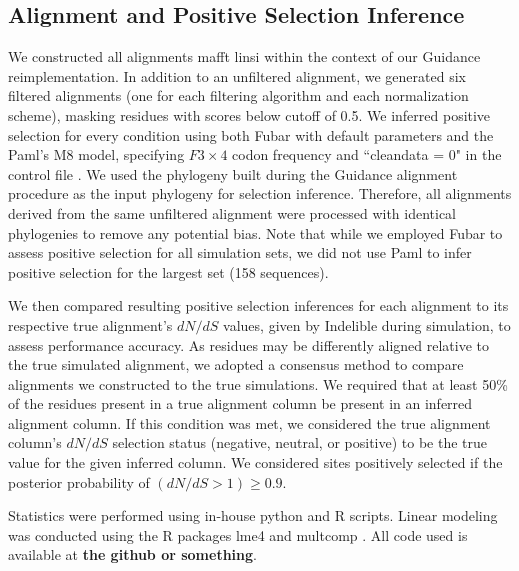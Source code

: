 \documentclass[10pt]{article}
\begin{document}
\subsection*{Alignment and Positive Selection Inference}
We constructed all alignments mafft linsi \citep{Katoh2002,Katoh2005} within the context of our Guidance reimplementation. In addition to an unfiltered alignment, we generated six filtered alignments (one for each filtering algorithm and each normalization scheme), masking residues with scores below cutoff of 0.5. We inferred positive selection for every condition using both Fubar \citep{Murrell2013} with default parameters and the Paml's M8 model, specifying $F3\times4$ codon frequency and ``cleandata = 0" in the control file \citep{Yang2007}. We used the phylogeny built during the Guidance alignment procedure as the input phylogeny for selection inference. Therefore, all alignments derived from the same unfiltered alignment were processed with identical phylogenies to remove any potential bias. Note that while we employed Fubar to assess positive selection for all simulation sets, we did not use Paml to infer positive selection for the largest set (158 sequences).

We then compared resulting positive selection inferences for each alignment to its respective true alignment's $dN/dS$ values, given by Indelible during simulation, to assess performance accuracy. As residues may be differently aligned relative to the true simulated alignment, we adopted a consensus method to compare alignments we constructed to the true simulations. We required that at least 50\% of the residues present in a true alignment column be present in an inferred alignment column. If this condition was met, we considered the true alignment column’s $dN/dS$  selection status (negative, neutral, or positive) to be the true value for the given inferred column. We considered sites positively selected if the posterior probability of $(dN/dS>1) \geq 0.9$.

Statistics were performed using in-house python and R scripts. Linear modeling was conducted using the R packages lme4 \citep{Bates2012} and
multcomp \citep{Hothorn2008}. All code used is available at \textbf{the github or something}.
\end{document}
